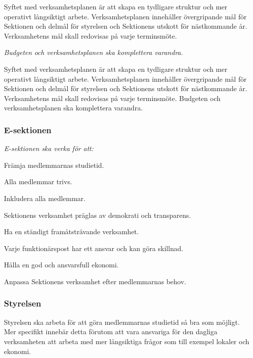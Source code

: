 \documentclass[../_main/handlingar.tex]{subfiles}
\begin{document}
Syftet med verksamhetsplanen är att skapa en tydligare struktur och mer operativt långsiktigt arbete. Verksamhetsplanen innehåller övergripande mål för Sektionen och delmål för styrelsen och Sektionens utskott för nästkommande år. Verksamhetens mål skall redovisas på varje terminsmöte.

\emph{Budgeten och verksamhetsplanen ska komplettera varandra.}

Syftet med verksamhetsplanen är att skapa en tydligare struktur och mer operativt långsiktigt arbete. Verksamhetsplanen innehåller övergripande mål för Sektionen och delmål för styrelsen och Sektionens utskott för nästkommande år. Verksamhetens mål skall redovisas på varje terminsmöte. Budgeten och verksamhetsplanen ska komplettera varandra.

\subsubsection*{E-sektionen}
\emph{E-sektionen ska verka för att:}
\begin{dashlist}
	\item Främja medlemmarnas studietid.
	\item Alla medlemmar trivs.
	\item Inkludera alla medlemmar.
	\item Sektionens verksamhet präglas av demokrati och transparens.
	\item Ha en ständigt framåtsträvande verksamhet.
	\item Varje funktionärspost har ett ansvar och kan göra skillnad.
	\item Hålla en god och ansvarsfull ekonomi.
	\item Anpassa Sektionens verksamhet efter medlemmarnas behov.
\end{dashlist}

\subsubsection*{Styrelsen}
Styrelsen ska arbeta för att göra medlemmarnas studietid så bra som möjligt. Mer specifikt innebär detta förutom att vara ansvariga för den dagliga verksamheten att arbeta med mer långsiktiga frågor som till exempel lokaler och ekonomi.
\end{document}
